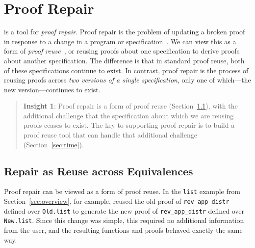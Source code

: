 \section{Proof Repair}
\label{sec:key1}

\toolname is a tool for \textit{proof repair}.
Proof repair is the problem of updating a broken proof in response to a change in a program or specification~\cite{PGL-045, pumpkinpatch}.
We can view this as a form of 
\textit{proof reuse}~\cite{Ringer2019, felty1994generalization, caplan1995logical, pons2000generalization, johnsen2004theorem}, %
or reusing proofs about one specification to derive proofs about another specification.
The difference is that in standard proof reuse, both of these specifications continue to exist.
In contrast, proof repair is the process of reusing proofs across \textit{two versions of a single specification},
only one of which---the new version---continues to exist.

\begin{quote}
\textbf{Insight 1}:
Proof repair is a form of proof reuse (Section~\ref{sec:repair}), with the additional
challenge that the specification about which
we are reusing proofs ceases to exist.
The key to supporting proof repair is to build a proof reuse
tool that can handle that additional challenge (Section~\ref{sec:time}).
\end{quote}

\subsection{Repair as Reuse across Equivalences}
\label{sec:repair}

Proof repair can be viewed as a form of proof reuse. 
In the \lstinline{list} example from Section~\ref{sec:overview}, for example, \toolname
reused the old proof of \lstinline{rev_app_distr} defined over \lstinline{Old.list}
to generate the new proof of \lstinline{rev_app_distr} defined over \lstinline{New.list}.
Since this change was simple, this required no additional information from the user, and the resulting functions
and proofs behaved exactly the same way.

